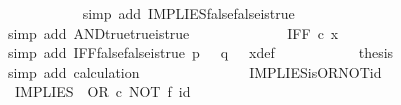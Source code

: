 \begin{isabellebody}
\ \ \ \ \ \ \ \ \ \ \isamarkupfalse%
\ {\isacharparenleft}{\kern0pt}simp\ add{\isacharcolon}{\kern0pt}\ IMPLIES{\isacharunderscore}{\kern0pt}false{\isacharunderscore}{\kern0pt}false{\isacharunderscore}{\kern0pt}is{\isacharunderscore}{\kern0pt}true{\isacharparenright}{\kern0pt}\isanewline
\ \ \ \ \ \ \ \ \isamarkupfalse%
\ \isamarkupfalse%
\ {\isachardoublequoteopen}{\isachardot}{\kern0pt}{\isachardot}{\kern0pt}{\isachardot}{\kern0pt}\ {\isacharequal}{\kern0pt}\ {\isasymt}{\isachardoublequoteclose}\isanewline
\ \ \ \ \ \ \ \ \ \ \isamarkupfalse%
\ {\isacharparenleft}{\kern0pt}simp\ add{\isacharcolon}{\kern0pt}\ AND{\isacharunderscore}{\kern0pt}true{\isacharunderscore}{\kern0pt}true{\isacharunderscore}{\kern0pt}is{\isacharunderscore}{\kern0pt}true{\isacharparenright}{\kern0pt}\isanewline
\ \ \ \ \ \ \ \ \isamarkupfalse%
\ \isamarkupfalse%
\ {\isachardoublequoteopen}{\isachardot}{\kern0pt}{\isachardot}{\kern0pt}{\isachardot}{\kern0pt}\ {\isacharequal}{\kern0pt}\ IFF\ {\isasymcirc}\isactrlsub c\ x{\isachardoublequoteclose}\isanewline
\ \ \ \ \ \ \ \ \ \ \isamarkupfalse%
\ {\isacharparenleft}{\kern0pt}simp\ add{\isacharcolon}{\kern0pt}\ IFF{\isacharunderscore}{\kern0pt}false{\isacharunderscore}{\kern0pt}false{\isacharunderscore}{\kern0pt}is{\isacharunderscore}{\kern0pt}true\ {\isacartoucheopen}p\ {\isacharequal}{\kern0pt}\ {\isasymf}{\isacartoucheclose}\ {\isacartoucheopen}q\ {\isacharequal}{\kern0pt}\ {\isasymf}{\isacartoucheclose}\ x{\isacharunderscore}{\kern0pt}def{\isacharparenright}{\kern0pt}\isanewline
\ \ \ \ \ \ \ \ \isamarkupfalse%
\ \isamarkupfalse%
\ {\isacharquery}{\kern0pt}thesis\isanewline
\ \ \ \ \ \ \ \ \ \ \isamarkupfalse%
\ {\isacharparenleft}{\kern0pt}simp\ add{\isacharcolon}{\kern0pt}\ calculation{\isacharparenright}{\kern0pt}\isanewline
\ \ \ \ \ \ \isamarkupfalse%
\isanewline
\ \ \ \ \isamarkupfalse%
\isanewline
\ \ \isamarkupfalse%
\isanewline
{}\isamarkupfalse%
%
\endisatagproof
{\isafoldproof}%
%
\isadelimproof
\isanewline
%
\endisadelimproof
\isanewline
{}\isamarkupfalse%
\ IMPLIES{\isacharunderscore}{\kern0pt}is{\isacharunderscore}{\kern0pt}OR{\isacharunderscore}{\kern0pt}NOT{\isacharunderscore}{\kern0pt}id{\isacharcolon}{\kern0pt}\isanewline
\ \ {\isachardoublequoteopen}IMPLIES\ {\isacharequal}{\kern0pt}\ OR\ {\isasymcirc}\isactrlsub c\ {\isacharparenleft}{\kern0pt}NOT\ {\isasymtimes}\isactrlsub f\ id{\isacharparenleft}{\kern0pt}{\isasymOmega}{\isacharparenright}{\kern0pt}{\isacharparenright}{\kern0pt}{\isachardoublequoteclose}\isanewline

\end{isabellebody}
